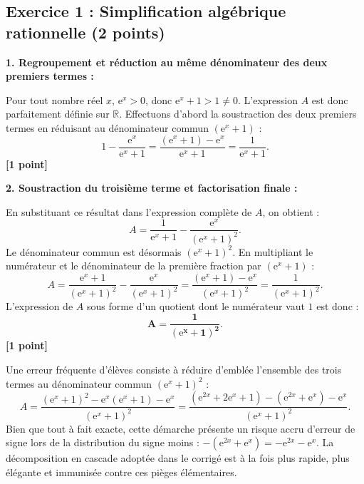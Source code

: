 \documentclass[11pt,a4paper]{article}
\newcommand{\R}{\mathbb{R}}
\newcommand{\e}{\mathrm{e}}
\begin{document}
\vspace{0.3cm}

\subsection*{Exercice 1 : Simplification algébrique rationnelle \hfill \normalfont\normalsize (2 points)}

\begin{correctionbox}
\textbf{1. Regroupement et réduction au même dénominateur des deux premiers termes :}

Pour tout nombre réel $x$, $\e^x > 0$, donc $\e^x + 1 > 1 \neq 0$. L'expression $A$ est donc parfaitement définie sur $\R$.
Effectuons d'abord la soustraction des deux premiers termes en réduisant au dénominateur commun $(\e^x + 1)$ :
\[
1 - \frac{\e^x}{\e^x + 1} = \frac{(\e^x + 1) - \e^x}{\e^x + 1} = \frac{1}{\e^x + 1}.
\] \hfill \textbf{[1 point]}

\medskip
\textbf{2. Soustraction du troisième terme et factorisation finale :}

En substituant ce résultat dans l'expression complète de $A$, on obtient :
\[
A = \frac{1}{\e^x + 1} - \frac{\e^x}{(\e^x + 1)^2}.
\]
Le dénominateur commun est désormais $(\e^x + 1)^2$. En multipliant le numérateur et le dénominateur de la première fraction par $(\e^x + 1)$ :
\[
A = \frac{\e^x + 1}{(\e^x + 1)^2} - \frac{\e^x}{(\e^x + 1)^2} = \frac{(\e^x + 1) - \e^x}{(\e^x + 1)^2} = \frac{1}{(\e^x + 1)^2}.
\]
L'expression de $A$ sous forme d'un quotient dont le numérateur vaut $1$ est donc :
\[
\mathbf{A = \frac{1}{(\e^x + 1)^2}}.
\] \hfill \textbf{[1 point]}
\end{correctionbox}

\begin{alertebox}
Une erreur fréquente d'élèves consiste à réduire d'emblée l'ensemble des trois termes au dénominateur commun $(\e^x + 1)^2$ :
\[
A = \frac{(\e^x + 1)^2 - \e^x(\e^x + 1) - \e^x}{(\e^x + 1)^2} = \frac{(\e^{2x} + 2\e^x + 1) - (\e^{2x} + \e^x) - \e^x}{(\e^x + 1)^2}.
\]
Bien que tout à fait exacte, cette démarche présente un risque accru d'erreur de signe lors de la distribution du signe moins : $-(\e^{2x} + \e^x) = -\e^{2x} - \e^x$. La décomposition en cascade adoptée dans le corrigé est à la fois plus rapide, plus élégante et immunisée contre ces pièges élémentaires.
\end{alertebox}
\end{document}
